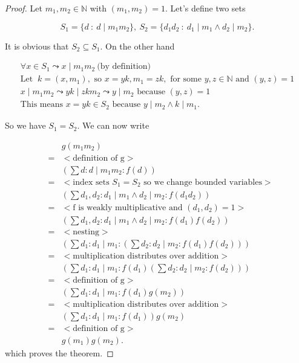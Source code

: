 \begin{proof}
	
Let $m_1,m_2 \in \mathbb{N}$ with $(m_1, m_2) = 1$. Let's define two sets

\[
	S_1 = \{ d\ :\ d \mid m_1 m_2 \}, \ S_2 = \{ d_1 d_2\ :\ d_1 \mid m_1 \wedge d_2 \mid m_2 \}.
\]		

\noindent It is obvious that $S_2 \subseteq S_1$. On the other hand

\[
	\begin{array}{l}
	              \forall x \in S_1 \leadsto x \mid m_1 m_2 \ \mbox{(by definition)} \\
	              \mbox{Let } \ k = (x, m_1), \mbox{ so } x = y k, m_1 = z k,  \mbox{ for some } y, z \in \mathbb{N} \mbox{ and } (y, z) = 1 \\
	              x \mid m_1 m_2 \leadsto y k \mid z k m_2 \leadsto y \mid m_2 \mbox{ because } (y, z) = 1\\
	              \mbox{This means } x = y k \in S_2 \mbox{ because } y \mid m_2 \wedge k \mid m_1.
	 \end{array}       
\]

\noindent So we have $S_1 = S_2$. We can now write

\[
   \begin{array}{lcl}
		&&g(m_1 m_2) \\
	      &=& { < \mbox{definition of g} >} \\      
                  &&(\sum d: d \mid m_1 m_2 : f(d)) \\
       	      &=& { < \mbox{index sets }S_1 = S_2\mbox{ so we change bounded variables}  >} \\
                  && (\sum d_1, d_2: d_1 \mid m_1 \wedge d_2 \mid m_2 : f(d_1 d_2)) \\
 	       &=& { < \mbox{f is weakly multiplicative and } (d_1, d_2) = 1 > }  \\
	         && (\sum d_1, d_2: d_1 \mid m_1 \wedge d_2 \mid m_2 : f(d_1) f(d_2))\\
	        &=& { < \mbox{nesting}  > }  \\ 
	        && (\sum d_1: d_1 \mid m_1 : (\sum d_2: d_2 \mid m_2: f(d_1) f(d_2))) \\
	        &=& { < \mbox{multiplication distributes over addition}  > }  \\
	         && (\sum d_1: d_1 \mid m_1 : f(d_1) (\sum d_2: d_2 \mid m_2: f(d_2))) \\
	        &=& { < \mbox{definition of g}  > }  \\ 
	        && (\sum d_1: d_1 \mid m_1 : f(d_1) g(m_2)) \\
	        &=& { < \mbox{multiplication distributes over addition}  > }  \\
	        	&& (\sum d_1: d_1 \mid m_1 : f(d_1)) g(m_2) \\
		&=& { < \mbox{definition of g}  > }  \\ 
		&& g(m_1) g(m_2).
   \end{array}
\]
which proves the theorem.
\end{proof}

